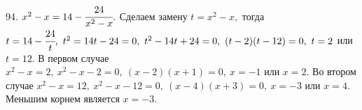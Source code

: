94. $x^2-x=14-\cfrac{24}{x^2-x}.$ Сделаем замену $t=x^2-x,$ тогда $t=14-\cfrac{24}{t},\ t^2=14t-24=0,\ t^2-14t+24=0,\ (t-2)(t-12)=0,\ t=2$ или $t=12.$ В первом случае $x^2-x=2,\ x^2-x-2=0,\ (x-2)(x+1)=0,\ x=-1$ или $x=2.$ Во втором случае $x^2-x=12,\ x^2-x-12=0,\ (x-4)(x+3)=0,\ x=-3$ или $x=4.$ Меньшим корнем является $x=-3.$\\

